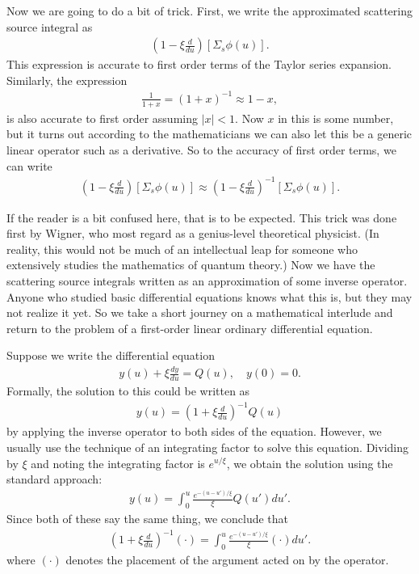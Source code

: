 Now we are going to do a bit of trick. First, we write the approximated scattering source integral as
\begin{align}
  \left( 1 - \xi \frac{d}{du} \right) [ \Sigma_s \phi(u) ] . \nonumber
\end{align}
This expression is accurate to first order terms of the Taylor series expansion. Similarly, the expression
\begin{align}
  \frac{1}{1 + x} = ( 1 + x )^{-1} \approx 1 - x ,
\end{align}
is also accurate to first order assuming $|x| < 1$. Now $x$ in this is some number, but it turns out according to the mathematicians we can also let this be a generic linear operator such as a derivative. So to the accuracy of first order terms, we can write
\begin{align}
  \left( 1 - \xi \frac{d}{du} \right) [ \Sigma_s \phi(u) ] \approx \left( 1 - \xi \frac{d}{du} \right)^{-1} [ \Sigma_s \phi(u) ] .
\end{align}

If the reader is a bit confused here, that is to be expected. This trick was done first by Wigner, who most regard as a genius-level theoretical physicist. (In reality, this would not be much of an intellectual leap for someone who extensively studies the mathematics of quantum theory.) Now we have the scattering source integrals written as an approximation of some inverse operator. Anyone who studied basic differential equations knows what this is, but they may not realize it yet. So we take a short journey on a mathematical interlude and return to the problem of a first-order linear ordinary differential equation. 

Suppose we write the differential equation
\begin{align}
  y(u) + \xi \frac{dy}{du}  = Q(u), \quad y(0) = 0.
\end{align}
Formally, the solution to this could be written as
\begin{align}
  y(u) = \left( 1 + \xi \frac{d}{du} \right)^{-1} Q(u) 
\end{align}
by applying the inverse operator to both sides of the equation. However, we usually use the technique of an integrating factor to solve this equation. Dividing by $\xi$ and noting the integrating factor is $e^{u/\xi}$, we obtain the solution using the standard approach:
\begin{align}
  y(u) = \int_0^u \frac{ e^{-(u - u')/\xi} }{ \xi } Q(u') du'.
\end{align}
Since both of these say the same thing, we conclude that
\begin{align}
  \left( 1 + \xi \frac{d}{du} \right)^{-1} ( \cdot ) = \int_0^u \frac{ e^{-(u - u')/\xi} }{ \xi } ( \cdot ) du' .
\end{align}
where $(\cdot)$ denotes the placement of the argument acted on by the operator.

